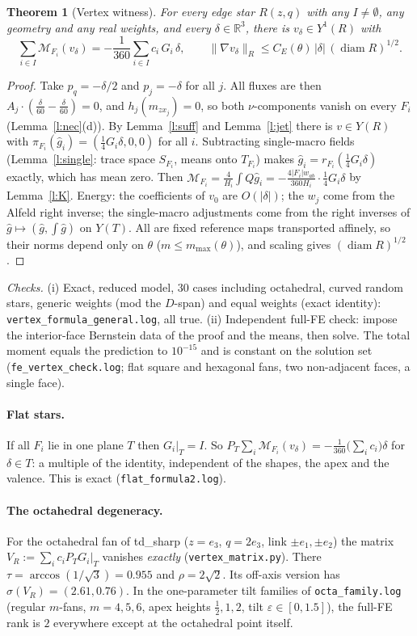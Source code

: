 \documentclass[11pt]{article}
\newtheorem{theorem}{Theorem}[section]
\theoremstyle{definition}
\newcommand{\R}{\mathbb R}
\newcommand{\M}{\mathcal M}
\newcommand{\gh}{\hat g}
\newcommand{\norm}[1]{\lVert #1\rVert}
\DeclareMathOperator{\diam}{diam}
\begin{document}
\begin{theorem}[Vertex witness]\label{t:vertex}
For every edge star $R(z,q)$ with any $I\neq\emptyset$, any geometry and any real weights, and every $\delta\in\R^3$, there is $v_\delta\in Y^1(R)$ with
\[
\sum_{i\in I}\M_{F_i}(v_\delta)=-\frac1{360}\sum_{i\in I}c_i\,G_i\,\delta,\qquad \norm{\nabla v_\delta}_R\le C_E(\theta)\,|\delta|\,(\diam R)^{1/2}.
\]
\end{theorem}
\begin{proof}
Take $p_q=-\delta/2$ and $p_j=-\delta$ for all $j$. All fluxes are then $A_j\cdot(\frac{\delta}{60}-\frac{\delta}{60})=0$, and $h_j(m_{zx_j})=0$, so both $\nu$-components vanish on every $F_i$ (Lemma~\ref{l:nec}(d)). By Lemma~\ref{l:suff} and Lemma~\ref{l:jet} there is $v\in Y(R)$ with $\pi_{F_i}(\gh_i)=(\frac14G_i\delta,0,0)$ for all $i$. Subtracting single-macro fields (Lemma~\ref{l:single}: trace space $S_{F_i}$, means onto $T_{F_i}$) makes $\gh_i=r_{F_i}(\frac14G_i\delta)$ exactly, which has mean zero. Then $\M_{F_i}=\frac4{H_i}\int Q\gh_i=-\frac{4|F_i|w_{ab}}{360H_i}\cdot\frac14G_i\delta$ by Lemma~\ref{l:K}. Energy: the coefficients of $v_0$ are $O(|\delta|)$; the $w_j$ come from the Alfeld right inverse; the single-macro adjustments come from the right inverses of $\gh\mapsto(\gh,\int\gh)$ on $Y(T)$. All are fixed reference maps transported affinely, so their norms depend only on $\theta$ ($m\le m_{\max}(\theta)$), and scaling gives $(\diam R)^{1/2}$.
\end{proof}
\emph{Checks.} (i) Exact, reduced model, $30$ cases including octahedral, curved random stars, generic weights (mod the $D$-span) and equal weights (exact identity): \texttt{vertex\_formula\_general.log}, all true. (ii) Independent full-FE check: impose the interior-face Bernstein data of the proof and the means, then solve. The total moment equals the prediction to $10^{-15}$ and is constant on the solution set (\texttt{fe\_vertex\_check.log}; flat square and hexagonal fans, two non-adjacent faces, a single face).

\paragraph{Flat stars.} If all $F_i$ lie in one plane $T$ then $G_i|_T=I$. So $P_T\sum_i\M_{F_i}(v_\delta)=-\frac1{360}\bigl(\sum_ic_i\bigr)\delta$ for $\delta\in T$: a multiple of the identity, independent of the shapes, the apex and the valence. This is exact (\texttt{flat\_formula2.log}).

\paragraph{The octahedral degeneracy.} For the octahedral fan of td\_sharp ($z=e_3$, $q=2e_3$, link $\pm e_1,\pm e_2$) the matrix $V_R:=\sum_ic_iP_TG_i|_T$ vanishes \emph{exactly} (\texttt{vertex\_matrix.py}). There $\tau=\arccos(1/\sqrt3)=0.955$ and $\rho=2\sqrt2$. Its off-axis version has $\sigma(V_R)=(2.61,0.76)$. In the one-parameter tilt families of \texttt{octa\_family.log} (regular $m$-fans, $m=4,5,6$, apex heights $\frac12,1,2$, tilt $\varepsilon\in[0,1.5]$), the full-FE rank is $2$ everywhere except at the octahedral point itself.
\end{document}
